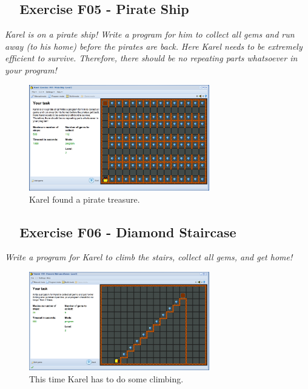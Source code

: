 \documentclass[article,A4,12pt]{llncs}
\begin{document}
{{{{\subsection{\ \ Exercise F05 - Pirate Ship}

{\em Karel is on a pirate ship! Write a program for him to collect all 
gems and run away (to his home) before the pirates are back. Here Karel 
needs to be extremely efficient to survive. Therefore, there should be 
no repeating parts whatsoever in your program!}


\begin{figure}[!ht]
\begin{center}
\includegraphics[width=0.7\textwidth]{img/f05.png}
\end{center}
\vspace{-4mm}
\caption{Karel found a pirate treasure.}
\label{fig:f05}
\vspace{-10mm}
\end{figure}
\noindent

\newpage
\subsection{\ \ Exercise F06 - Diamond Staircase}

{\em Write a program for Karel to climb the stairs, collect all gems, and get home!}


\begin{figure}[!ht]
\begin{center}
\includegraphics[width=0.7\textwidth]{img/g01.png}
\end{center}
\vspace{-4mm}
\caption{This time Karel has to do some climbing.}
\label{fig:g01}
\vspace{-4mm}
\end{figure}
\noindent


}}}}
\end{document}

